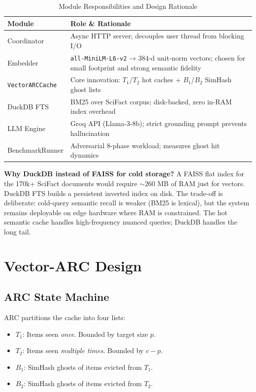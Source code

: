 \documentclass[conference,10pt]{IEEEtran}
\begin{document}
\begin{table}[htbp]
\centering
\caption{Module Responsibilities and Design Rationale}
\label{tab:modules}
\begin{tabularx}{\columnwidth}{@{}lX@{}}
\toprule
\textbf{Module} & \textbf{Role \& Rationale} \\ \midrule
Coordinator & Async HTTP server; decouples user thread from blocking I/O \\
Embedder & \texttt{all-MiniLM-L6-v2} → 384-d unit-norm vectors; chosen for small footprint and strong semantic fidelity \\
\texttt{VectorARCCache} & Core innovation: $T_1/T_2$ hot caches + $B_1/B_2$ SimHash ghost lists \\
DuckDB FTS & BM25 over SciFact corpus; disk-backed, zero in-RAM index overhead \\
LLM Engine & Groq API (Llama-3-8b); strict grounding prompt prevents hallucination \\
BenchmarkRunner & Adversarial 8-phase workload; measures ghost hit dynamics \\
\bottomrule
\end{tabularx}
\end{table}

\textbf{Why DuckDB instead of FAISS for cold storage?} A FAISS flat index for the 170k+ SciFact documents would require $\sim$260 MB of RAM just for vectors. DuckDB FTS builds a persistent inverted index on disk. The trade-off is deliberate: cold-query semantic recall is weaker (BM25 is lexical), but the system remains deployable on edge hardware where RAM is constrained. The hot semantic cache handles high-frequency nuanced queries; DuckDB handles the long tail.

\section{Vector-ARC Design}

\subsection{ARC State Machine}

ARC partitions the cache into four lists:

\begin{itemize}
  \item $T_1$: Items seen \textit{once}. Bounded by target size $p$.
  \item $T_2$: Items seen \textit{multiple times}. Bounded by $c - p$.
  \item $B_1$: SimHash ghosts of items evicted from $T_1$.
  \item $B_2$: SimHash ghosts of items evicted from $T_2$.
\end{itemize}
\end{document}
